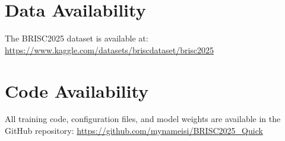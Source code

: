 \documentclass[11pt,a4paper]{article}
\begin{document}
\section*{Data Availability}

The BRISC2025 dataset is available at: \url{https://www.kaggle.com/datasets/briscdataset/brisc2025}

\section*{Code Availability}

All training code, configuration files, and model weights are available in the GitHub repository: \url{https://github.com/mynameisi/BRISC2025_Quick}
\end{document}
